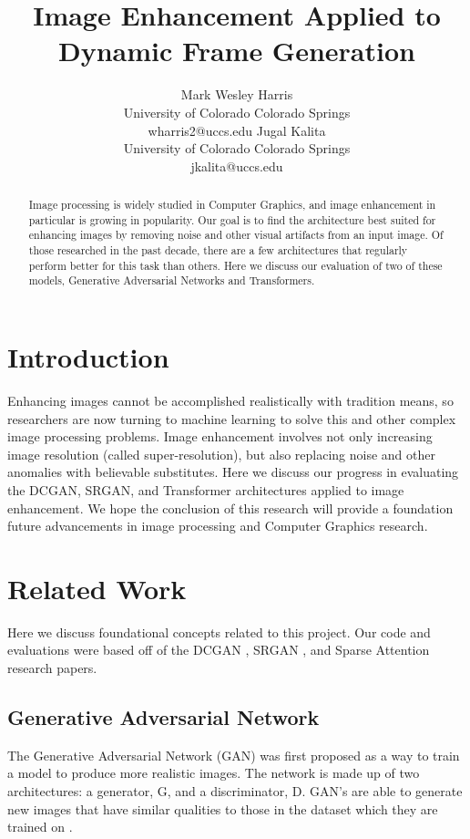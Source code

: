 \documentclass[letterpaper]{article} %
\title{Image Enhancement Applied to Dynamic Frame Generation}
\author{Mark Wesley Harris\\ %
University of Colorado Colorado Springs\\
wharris2@uccs.edu %
\And
Jugal Kalita\\
University of Colorado Colorado Springs\\
jkalita@uccs.edu
}
\begin{document}
\maketitle

\begin{abstract}
Image processing is
widely studied in Computer Graphics, and
image enhancement in particular is growing in popularity.
Our goal is to find the architecture best suited for
enhancing images by removing
noise and other visual artifacts from an input image.
Of those researched in the past decade,
there are a few architectures that regularly perform better for this task than others.
Here we discuss our evaluation of two of these models,
Generative Adversarial Networks and Transformers.
\end{abstract}

\section{Introduction}
Enhancing images cannot be accomplished realistically with tradition means,
so researchers are now turning to machine learning to solve
this and other complex image processing problems.
Image enhancement involves not only increasing image resolution
(called super-resolution), but also replacing noise and other anomalies with
believable substitutes.
Here we discuss our progress in evaluating
the DCGAN, SRGAN, and Transformer architectures
applied to image enhancement.
We hope the conclusion of this research will
provide a foundation
future advancements in image processing
and Computer Graphics research.

\section{Related Work}
Here we discuss foundational concepts related to this project.
Our code and evaluations were based off of the DCGAN
\cite{generative_adversarial_networks}, SRGAN
\cite{srgan}, and Sparse Attention
\cite{generative_transformers} research papers.

\subsection{Generative Adversarial Network}
The Generative Adversarial Network (GAN)
was first proposed as a way to train a model to produce more realistic images.
The network is made up of two architectures:
a generator, G, and a discriminator, D.
GAN's are able to generate new images that have similar qualities to
those in the dataset which they are trained on
\cite{generative_adversarial_networks}.
\end{document}
